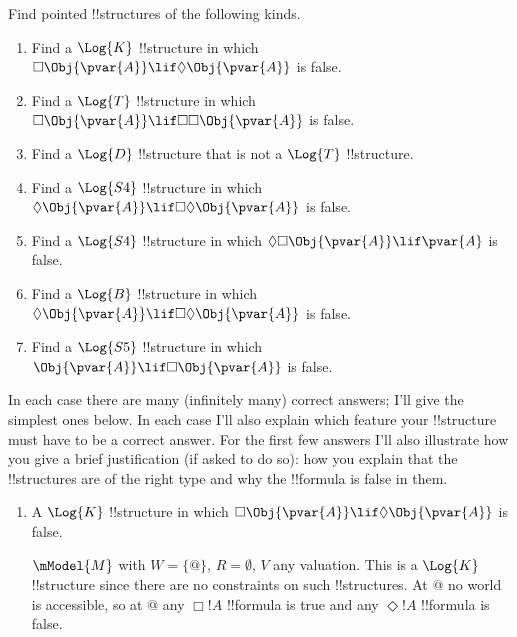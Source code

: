 \documentclass[../../../include/open-logic-section]{subfiles}
\begin{document}


\begin{prob}
    \citep[exercise 3.1 items 1-7]{MacFarlane-2020-PhilosophicalLogicContemporary}
    Find pointed !!{structure}s of the following kinds. 
    \begin{enumerate}
        \item Find a $\Log{K}$ !!{structure} in which
        $\Box\Obj{\pvar{A}}\lif\Diamond\Obj{\pvar{A}}$ is false.
        \item Find a $\Log{T}$ !!{structure} in which
        $\Box\Obj{\pvar{A}}\lif\Box\Box\Obj{\pvar{A}}$ is false.
        \item Find a $\Log{D}$ !!{structure} that is not a $\Log{T}$
        !!{structure}.
        \item Find a $\Log{S4}$ !!{structure} in which 
        $\Diamond\Obj{\pvar{A}}\lif\Box\Diamond\Obj{\pvar{A}}$ is false.
        \item Find a $\Log{S4}$ !!{structure} in which 
        $\Diamond\Box\Obj{\pvar{A}}\lif\pvar{A}$ is false.
        \item Find a $\Log{B}$ !!{structure} in which 
        $\Diamond\Obj{\pvar{A}}\lif\Box\Diamond\Obj{\pvar{A}}$ is false.
        \item Find a $\Log{S5}$ !!{structure} in which
        $\Obj{\pvar{A}}\lif\Box\Obj{\pvar{A}}$ is false.
    \end{enumerate}

    \begin{ans} In each case there are many (infinitely many) correct
        answers; I'll give the simplest ones below. In each case 
        I'll also explain which feature your !!{structure} must have to be 
        a correct answer. For the first few answers I'll also illustrate
        how you give a brief justification (if asked to do so): how you
        explain that the !!{structure}s are of the right type and 
        why the !!{formula} is false in them. 
    \begin{enumerate}
        \item A $\Log{K}$ !!{structure} in which
        $\Box\Obj{\pvar{A}}\lif\Diamond\Obj{\pvar{A}}$ is false.

        $\mModel{M}$ with $W=\{@\}$, $R=\emptyset$, $V$ any valuation.
        This is a $\Log{K}$ !!{structure} since there are no constraints on
        such !!{structure}s. At $@$ no world is accessible, so at $@$ any
        $\Box!A$ !!{formula} is true and any $\Diamond!A$ !!{formula}
        is false.


\end{enumerate}
\end{ans}
\end{prob}
\end{document}
